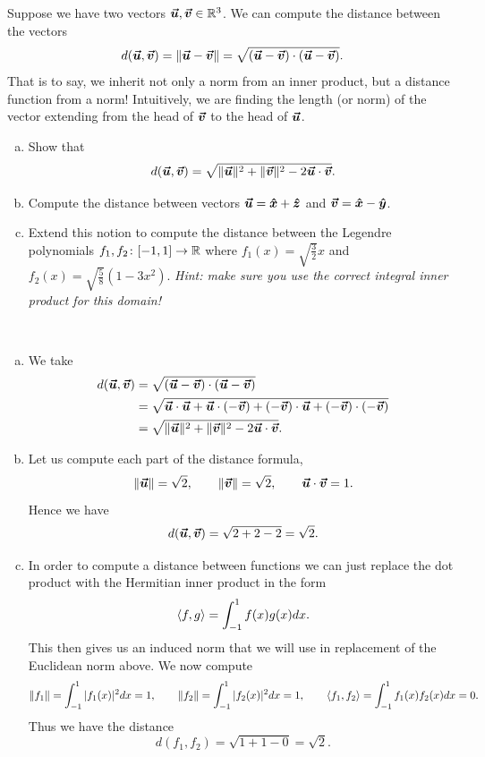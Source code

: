 \documentclass[12pt]{article} %
\begin{document}
\newpage
\begin{problem}
	Suppose we have two vectors $\boldsymbol{\vec{u}},\boldsymbol{\vec{v}} \in \mathbb{R}^3$.  We can compute the distance between the vectors
	\[
	d(\boldsymbol{\vec{u}},\boldsymbol{\vec{v}}) = \|\boldsymbol{\vec{u}}-\boldsymbol{\vec{v}}\| = \sqrt{(\boldsymbol{\vec{u}}-\boldsymbol{\vec{v}})\cdot(\boldsymbol{\vec{u}}-\boldsymbol{\vec{v}})}.
	\]
	That is to say, we inherit not only a norm from an inner product, but a distance function from a norm!  Intuitively, we are finding the length (or norm) of the vector extending from the head of $\boldsymbol{\vec{v}}$ to the head of $\boldsymbol{\vec{u}}$.
	\begin{enumerate}[(a)]
		\item Show that
		\[
		d(\boldsymbol{\vec{u}},\boldsymbol{\vec{v}}) = \sqrt{\|\boldsymbol{\vec{u}}\|^2+\|\boldsymbol{\vec{v}}\|^2-2\boldsymbol{\vec{u}}\cdot \boldsymbol{\vec{v}}}.
		\]
		\item Compute the distance between vectors $\boldsymbol{\vec{u}}=\boldsymbol{\hat{x}} + \boldsymbol{\hat{z}}$ and $\boldsymbol{\vec{v}} = \boldsymbol{\hat{x}} - \boldsymbol{\hat{y}}$.  
		\item Extend this notion to compute the distance between the Legendre polynomials $f_1,f_2\colon [-1,1] \to \mathbb{R}$ where $f_1(x)=\sqrt{\frac{3}{2}}x$ and $f_2(x)=\sqrt{\frac{5}{8}}\left(1-3x^2\right)$. \emph{Hint: make sure you use the correct integral inner product for this domain!}
	\end{enumerate}
\end{problem}
\begin{solution}~
	\begin{enumerate}[(a)]
		\item We take
		\begin{align*}
			d(\boldsymbol{\vec{u}},\boldsymbol{\vec{v}})&= \sqrt{(\boldsymbol{\vec{u}}-\boldsymbol{\vec{v}})\cdot(\boldsymbol{\vec{u}}-\boldsymbol{\vec{v}})}\\
				&= \sqrt{\boldsymbol{\vec{u}}\cdot \boldsymbol{\vec{u}} + \boldsymbol{\vec{u}}\cdot (-\boldsymbol{\vec{v}}) + (-\boldsymbol{\vec{v}})\cdot \boldsymbol{\vec{u}} +(-\boldsymbol{\vec{v}})\cdot (-\boldsymbol{\vec{v}})}\\
				&= \sqrt{\|\boldsymbol{\vec{u}}\|^2 + \|\boldsymbol{\vec{v}}\|^2 -2\boldsymbol{\vec{u}} \cdot \boldsymbol{\vec{v}}}.
		\end{align*}
		\item Let us compute each part of the distance formula,
		\[
		\|\boldsymbol{\vec{u}}\|= \sqrt{2}, \qquad \|\boldsymbol{\vec{v}}\|=\sqrt{2}, \qquad \boldsymbol{\vec{u}} \cdot \boldsymbol{\vec{v}} = 1.
		\]
		Hence we have
		\[
		d(\boldsymbol{\vec{u}},\boldsymbol{\vec{v}}) = \sqrt{2+2-2}=\sqrt{2}.
		\]
		\item In order to compute a distance between functions we can just replace the dot product with the Hermitian inner product in the form 
		\[
		\left\langle f, g \right\rangle=\int_{-1}^1 f(x)g(x)dx. 
		\]
		This then gives us an induced norm that we will use in replacement of the Euclidean norm above.  We now compute
		\[
		\|f_1\| = \int_{-1}^1 |f_1(x)|^2 dx = 1, \qquad \|f_2\|=\int_{-1}^1 |f_2(x)|^2dx =1, \qquad \left\langle f_1, f_2 \right\rangle = \int_{-1}^1 f_1(x)f_2(x)dx =0.
		\]
		Thus we have the distance
		\[
		d(f_1,f_2) = \sqrt{1+1-0}=\sqrt{2}.
		\]
	\end{enumerate}
\end{solution}
\end{document}
